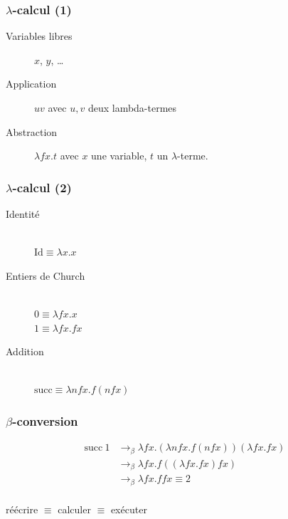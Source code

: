 \documentclass[14pt,utf8x,hyperref={pdfpagelabels=false}]{beamer}
\begin{document}
\begin{slideDecision}
  \begin{changeleftmargin}{1.1cm}
    \frametitle{$\lambda$-calcul (1)}

    \begin{description}
      \item[Variables libres] $x$, $y$, \ldots
      \item[Application] $u v$ avec $u, v$ deux lambda-termes
      \item[Abstraction] $\lambda f x . t$ avec $x$ une variable, $t$
        un $\lambda$-terme.
    \end{description}
  \end{changeleftmargin}
\end{slideDecision}

\begin{slideDecision}
  \begin{changeleftmargin}{1.1cm}
    \frametitle{$\lambda$-calcul (2)}
    \begin{description}
      \item[Identité]~\\
        $\text{Id} \equiv \lambda x . x$
      \item[Entiers de Church]~\\
        $0 \equiv \lambda f x . x$\\
        $1 \equiv \lambda f x . f x$
      \item[Addition]~\\
        $\text{succ} \equiv \lambda n f x . f (n f x)$
    \end{description}
  \end{changeleftmargin}
\end{slideDecision}

\begin{slideDecision}
  \begin{changeleftmargin}{1.1cm}
    \frametitle{$\beta$-conversion}

    \begin{equation*}
      \begin{array}{ll}
      \text{succ}~1 & \rightarrow_\beta \lambda f x . (\lambda n f x . f (n f x)) (\lambda f x . f x)\\
        & \rightarrow_\beta \lambda f x . f ((\lambda f x . f x) f x)\\
        & \rightarrow_\beta \lambda f x . f f x \equiv 2\\
      \end{array}
    \end{equation*}

    \begin{center}
      \alert{réécrire $\equiv$ calculer $\equiv$ exécuter}
    \end{center}

  \end{changeleftmargin}
\end{slideDecision}
\end{document}
